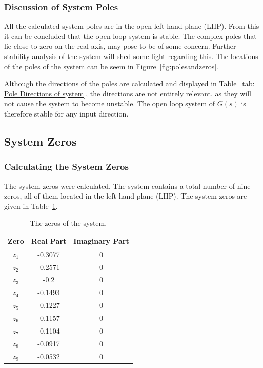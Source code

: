 \subsubsection{Discussion of System Poles}

All the calculated system poles are in the open left hand plane (LHP). From this it can be concluded that the open loop system is stable. The complex poles that lie close to zero on the real axis, may pose to be of some concern. Further stability analysis of the system will shed some light regarding this. The locations of the poles of the system can be seem in Figure~\ref{fig:polesandzeros}.

Although the directions of the poles are calculated and displayed in Table~\ref{tab: Pole Directions of system}, the directions are not entirely relevant, as they will not cause the system to become unstable. The open loop system of $G(s)$ is therefore stable for any input direction.

\subsection{System Zeros}
\label{sec:System Zeros}
\subsubsection{Calculating the System Zeros}

The system zeros were calculated. The system contains a total number of nine zeros, all of them located in the left hand plane (LHP). The system zeros are given in Table~\ref{tab: Zeros of system}.

\begin{table}[H]
	\centering
	\caption{The zeros of the system.}
	\begin{tabular}{ccc}
		\hline
		\textbf{Zero} & \textbf{Real Part} & \textbf{Imaginary Part} \\\hline
		$z_1$            & -0.3077            & 0                       \\
		$z_2$            & -0.2571            & 0                       \\
		$z_3$            & -0.2            & 0                  \\
		$z_4$            & -0.1493            & 0                 \\
		$z_5$            & -0.1227             & 0                  \\
		$z_6$            & -0.1157             & 0   \\
		$z_7$            & -0.1104             & 0   \\
		$z_8$            & -0.0917             & 0   \\
		$z_9$            & -0.0532             & 0   \\\hline             
	\end{tabular}
	\label{tab: Zeros of system}
\end{table}


